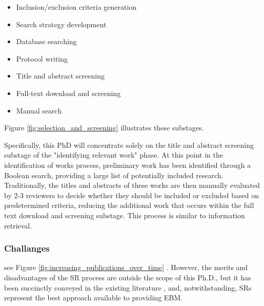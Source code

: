 \documentclass[10pt, english]{article}
\begin{document}
\begin{itemize}
    \item Inclusion/exclusion criteria generation
    \item Search strategy development
    \item Database searching
    \item Protocol writing
    \item Title and abstract screening
    \item Full-text download and screening
    \item Manual search
\end{itemize}

Figure \ref{fig:selection_and_screening} illustrates these substages.

Specifically, this PhD will concentrate solely on the title and abstract screening substage of the "identifying relevant work" phase. At this point in the identification of works process, preliminary work has been identified through a Boolean search, providing a large list of potentially included research. Traditionally, the titles and abstracts of these works are then manually evaluated by 2-3 reviewers to decide whether they should be included or excluded based on predetermined criteria, reducing the additional work that occurs within the full text download and screening substage. This process is similar to information retrieval.




\subsubsection{Challanges}



see Figure \ref{fig:increasing_publications_over_time} \cite{ghasemi_scientific_2022}. However, the merits and disadvantages of the SR process are outside the scope of this Ph.D., but it has been succinctly conveyed in the existing literature \cite{howick_front_2011}, and, notwithstanding, SRs represent the best approach available to providing EBM.
\end{document}
